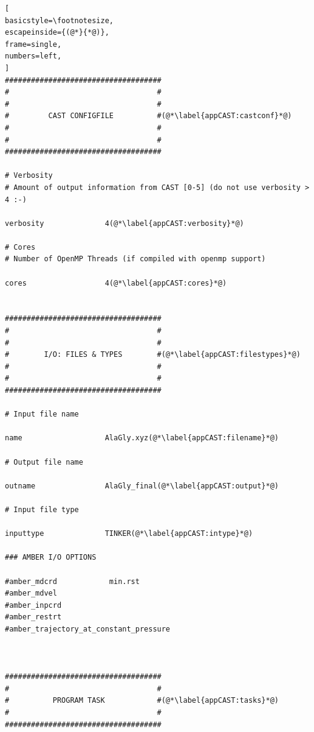 \documentclass[a4paper,11pt]{scrartcl}
\begin{document}
\begin{lstlisting}[
basicstyle=\footnotesize,
escapeinside={(@*}{*@)},
frame=single,
numbers=left,
]
####################################
#                                  #
#                                  #
#         CAST CONFIGFILE          #(@*\label{appCAST:castconf}*@)
#                                  #
#                                  #
#################################### 

# Verbosity 
# Amount of output information from CAST [0-5] (do not use verbosity > 4 :-)

verbosity              4(@*\label{appCAST:verbosity}*@)

# Cores
# Number of OpenMP Threads (if compiled with openmp support)

cores                  4(@*\label{appCAST:cores}*@)


####################################
#                                  #
#                                  #
#        I/O: FILES & TYPES        #(@*\label{appCAST:filestypes}*@)
#                                  #
#                                  #
####################################

# Input file name

name                   AlaGly.xyz(@*\label{appCAST:filename}*@)

# Output file name

outname                AlaGly_final(@*\label{appCAST:output}*@)

# Input file type

inputtype              TINKER(@*\label{appCAST:intype}*@)

### AMBER I/O OPTIONS

#amber_mdcrd            min.rst
#amber_mdvel
#amber_inpcrd
#amber_restrt
#amber_trajectory_at_constant_pressure



#################################### 
#                                  #
#          PROGRAM TASK            #(@*\label{appCAST:tasks}*@)
#                                  #
####################################


\end{lstlisting}
\end{document}
